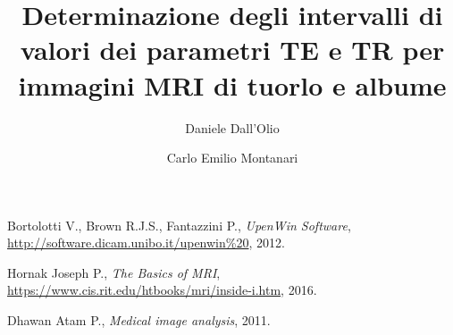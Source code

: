 \documentclass[10pt,a4paper,twocolumn]{article}
\title{Determinazione degli intervalli di valori dei parametri TE e TR per immagini MRI di tuorlo e albume}
\author{Daniele Dall'Olio \and Carlo Emilio Montanari}
\begin{document}
\maketitle









\begin{thebibliography}{9}

  Bortolotti V., Brown R.J.S., Fantazzini P.,
  \textit{UpenWin Software},
  \url{http://software.dicam.unibo.it/upenwin%20},
  2012.

 Hornak Joseph P.,
 \textit{The Basics of MRI},
 \url{https://www.cis.rit.edu/htbooks/mri/inside-i.htm},
 2016.

 Dhawan Atam P.,
 \textit{Medical image analysis},
 2011.

\end{thebibliography}
\end{document}
